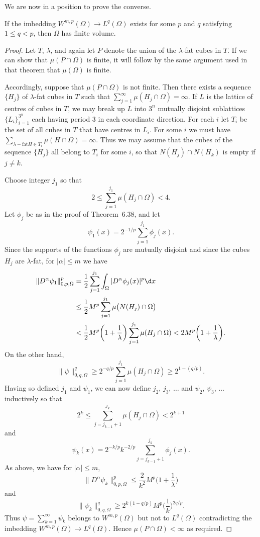 We are now in a position to prove the converse.

\begin{theorem}
  If the imbedding $W^{m,p}(\Omega) \to L^q(\Omega)$ exists for some $p$
  and $q$ satisfying $1\leq q<p$, then $\Omega$ has finite volume.
\end{theorem}

\begin{proof}
  Let $T$, $\lambda$, and again let $P$ denote the union of the $\lambda$-fat
  cubes in $T$. If we can show that $\mu(P\cap\Omega)$ is finite, it will
  follow by the same argument used in that theorem that $\mu(\Omega)$ is finite.

  Accordingly, suppose that $\mu(P\cap\Omega)$ is not finite. Then there
  exists a sequence $\{H_j\}$ of $\lambda$-fat cubes in $T$ such that
  $\sum_{j=1}^\infty \mu(H_j\cap\Omega)=\infty$. If $L$ is the lattice of
  centres of cubes in $T$, we may break up $L$ into $3^n$ mutually disjoint
  sublattices $\{L_i\}_{i=1}^{3^n}$ each having period $3$ in each coordinate
  direction. For each $i$ let $T_i$ be the set of all cubes in $T$ that
  have centres in $L_i$. For some $i$ we must have
  $\sum_{\lambda-\text{fat}H\in T_i} \mu(H\cap\Omega)=\infty$. Thus we may
  assume that the cubes of the sequence $\{H_j\}$ all belong to $T_i$
  for some $i$, so that $N(H_j)\cap N(H_k)$ is empty if $j\neq k$.

  Choose integer $j_1$ so that
  \[ 2\leq \sum_{j=1}^{j_1} \mu(H_j\cap\Omega) < 4. \]
  Let $\phi_j$ be as in the proof of Theorem~6.38, and let
  \[ \psi_1(x) = 2^{-1/p} \sum_{j=1}^{j_1} \phi_j(x). \]
  Since the supports of the functions $\phi_j$ are mutually disjoint
  and since the cubes $H_j$ are $\lambda$-fat, for $|\alpha|\leq m$ we have
  \begin{align*}
    \|D^\alpha \psi_1\|_{0,p,\Omega}^p
    & = \frac12 \sum_{j=1}^{j_1} \int_\Omega |D^\alpha \phi_j(x)|^p \d x \\
    & \leq \frac12 M^p \sum_{j=1}^{j_1} \mu\bigl(N(H_j)\cap\Omega\bigr) \\
    & < \frac12 M^p \biggl(1+\frac{1}{\lambda}\biggr) \sum_{j=1}^{j_1} \mu(H_j\cap\Omega)
      < 2M^p \biggl(1+\frac{1}{\lambda}\biggr).
  \end{align*}
  On the other hand,
  \[ \|\psi\|_{0,q,\Omega}^q \geq 2^{-q/p} \sum_{j=1}^{j_1} \mu(H_j\cap\Omega)
      \geq 2^{1-(q/p)}. \]
  Having so defined $j_1$ and $\psi_1$, we can now define $j_2$, $j_3$, $\ldots$
  and $\psi_2$, $\psi_3$, $\ldots$ inductively so that
  \[ 2^k \leq \sum_{j=j_{k-1}+1}^{j_k} \mu(H_j\cap\Omega) < 2^{k+1} \]
  and
  \[ \psi_k(x) = 2^{-k/p} k^{-2/p} \sum_{j=j_{k-1}+1}^{j_k} \phi_j(x). \]
  As above, we have for $|\alpha|\leq m$,
  \[ \|D^\alpha \psi_k\|_{0,p,\Omega}^p \leq \frac{2}{k^2} M^p 
      \biggl(1+\frac{1}{\lambda}\biggr) \]
  and
  \[\|\psi_k\|_{0,q,\Omega}^q \geq 2^{k(1-q/p)} M^p \biggl(\frac{1}{k}\biggr)^{2q/p}. \]
  Thus $\psi=\sum_{k=1}^\infty \psi_k$ belongs to $W^{m,p}(\Omega)$
  but not to $L^q(\Omega)$ contradicting the imbedding $W^{m,p}(\Omega)\to L^q(\Omega)$.
  Hence $\mu(P\cap\Omega)<\infty$ as required.
\end{proof}


